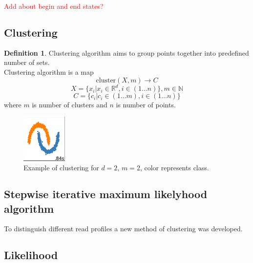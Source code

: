 \documentclass[a4paper, 12pt]{article}
\theoremstyle{definition}
\newtheorem{definition}{Definition}[section]
\theoremstyle{definition}
\theoremstyle{remark}
\newcommand\myworries[1]{\textcolor{red}{#1}}
\begin{document}
\myworries{Add about begin and end states?}


\subsection{Clustering}
\begin{definition}
    Clustering algorithm aims to group points together into predefined number of sets. \\
    Clustering algorithm is a map 
    $$\text{cluster} (X, m) \rightarrow C$$
    $$X = \{x_i | x_i \in \mathbb{R}^d, i \in \left( 1 \ldots n \right) \}, m \in \mathbb{N}$$
    $$C = \{ c_i | c_i \in \left( 1 \ldots m \right), i \in \left( 1 \ldots n \right)\}$$
    where $m$ is number of clusters and $n$ is number of points. 
\end{definition}

\begin{figure}[H]
    \includegraphics{example_clustering}
    \centering
    \caption{Example of clustering for $d=2$, $m=2$, color represents class.}
\end{figure}

\subsection{Stepwise iterative maximum likelyhood algorithm}
To distinguish different read profiles a new method of clustering was developed.
\subsection{Likelihood}
\end{document}
